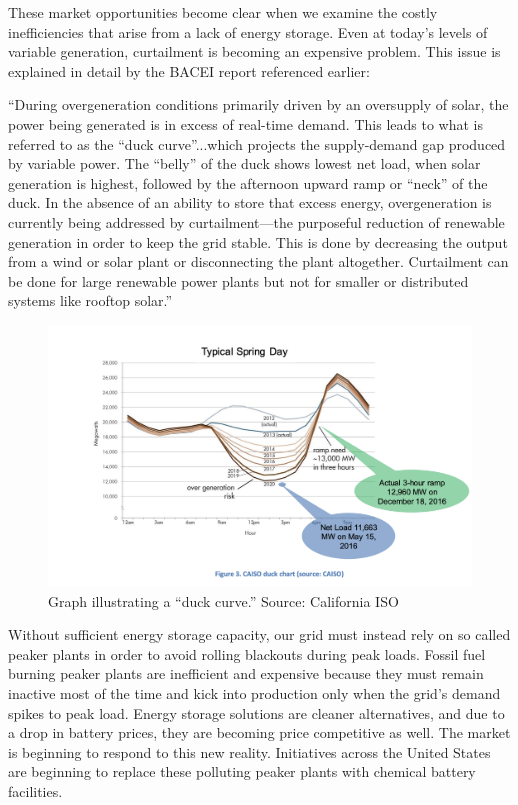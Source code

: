 \documentclass[hidelinks,12pt,a4paper]{article}
\begin{document}
These market opportunities become clear when we examine the costly inefficiencies that arise from a lack of energy storage. Even at today's levels of variable generation, curtailment is becoming an expensive problem. This issue is explained in detail by the BACEI report referenced earlier:

\begin{displayquote}
“During overgeneration conditions primarily driven by an oversupply of solar, the power being generated is in excess of real-time demand. This leads to what is referred to as the “duck curve”...which projects the supply-demand gap produced by variable power. The “belly” of the duck shows lowest net load, when solar generation is highest, followed by the afternoon upward ramp or “neck” of the duck. In the absence of an ability to store that excess energy, overgeneration is currently being addressed by curtailment—the purposeful reduction of renewable generation in order to keep the grid stable. This is done by decreasing the output from a wind or solar plant or disconnecting the plant altogether. Curtailment can be done for large renewable power plants but not for smaller or distributed systems like rooftop solar.” \cite{EnergyStorageCaliforniaClimateandEnergyGoals}
\end{displayquote}

\begin{figure}[ht!]
    \centering
    \includegraphics[width=1\textwidth]{california-duck-curve.png}
    \caption{Graph illustrating a “duck curve.” Source: California ISO \cite{UsingRenewablesToOperateLowCarbonGrid}}
\end{figure}
\FloatBarrier

Without sufficient energy storage capacity, our grid must instead rely on so called peaker plants in order to avoid rolling blackouts during peak loads. Fossil fuel burning peaker plants are inefficient and expensive because they must remain inactive most of the time and kick into production only when the grid's demand spikes to peak load. Energy storage solutions are cleaner alternatives, and due to a drop in battery prices, they are becoming price competitive as well. The market is beginning to respond to this new reality. Initiatives across the United States are beginning to replace these polluting peaker plants with chemical battery facilities. \cite{StorageWillReplaceThreeCaliforniaGasPlants, NewYorkMovesToPhaseOutOlderPeakingPlants}
\end{document}
